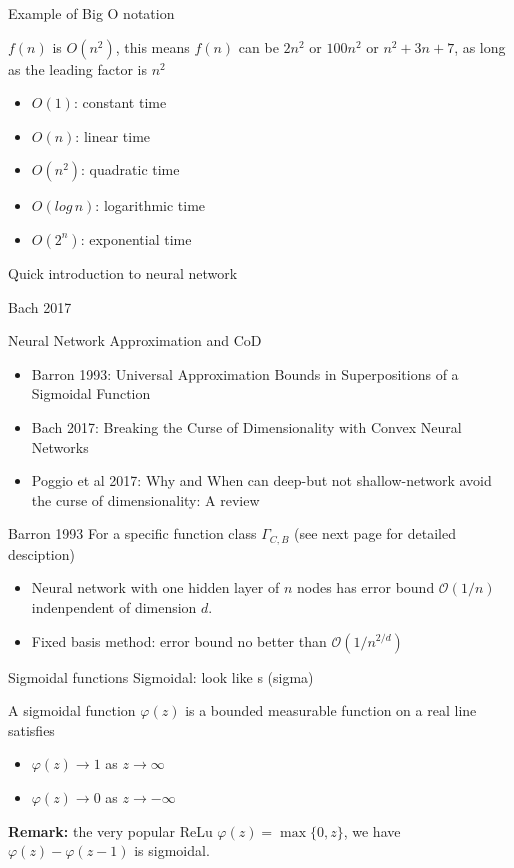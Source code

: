 \documentclass[aspectratio=169]{beamer} %
\begin{document}
\begin{frame}{Example of Big O notation}

$f(n)$ is $O(n^2)$, this means $f(n)$ can be $2n^2$ or $100 n^2$ or $n^2+3n+7$, as long as the leading factor is $n^2$
\begin{itemize}
    \item $O(1)$: constant time
    \item $O(n)$: linear time
    \item $O(n^2)$: quadratic time
    \item $O(log\,n )$:  logarithmic time
    \item $O(2^n)$: exponential time
\end{itemize}
\end{frame}
\begin{frame}{Quick introduction to neural network}
    
\end{frame}
\begin{frame}{Bach 2017}
    
\end{frame}
\begin{frame}{Neural Network Approximation and CoD}
\begin{itemize}
    \item Barron 1993: Universal Approximation Bounds in Superpositions of a Sigmoidal Function
    \item Bach 2017: Breaking the Curse of Dimensionality with Convex Neural Networks
    \item Poggio et al 2017: Why and When can deep-but not shallow-network avoid the curse of dimensionality: A review
\end{itemize}
    
\end{frame}
\begin{frame}{Barron 1993}
For a specific function class $\Gamma_{C,B}$ (see next page for detailed desciption)
\begin{itemize}
    \item Neural network with one hidden layer of $n$ nodes has error bound $\mathcal{O}(1/n)$ indenpendent of dimension $d$. 
    \item Fixed basis method: error bound no better than $\mathcal{O}(1/n^{2/d})$
\end{itemize}
\end{frame}
\begin{frame}{Sigmoidal functions}
Sigmoidal: look like s (sigma)
\begin{definition}
    A sigmoidal function $\varphi(z)$ is a bounded measurable function on a real line satisfies
    \begin{itemize}
        \item $\varphi(z)\to 1$ as $z\to \infty$
        \item $\varphi(z) \to 0$ as $z\to-\infty$
    \end{itemize}
\end{definition}
\textbf{Remark:} the very popular ReLu $\varphi(z) = \max\{0,z\}$, we have $\varphi(z)-\varphi(z-1)$ is sigmoidal.
\end{frame}
\end{document}
